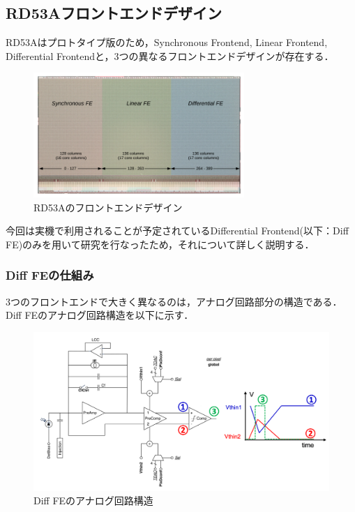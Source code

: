 \subsection{RD53Aフロントエンドデザイン}
RD53Aはプロトタイプ版のため，Synchronous Frontend, Linear Frontend, Differential Frontendと，3つの異なるフロントエンドデザインが存在する．

\begin{figure}[h]
\centering
\includegraphics[width=8cm]{./figure/RD53A_FE.png}
\caption{RD53Aのフロントエンドデザイン}
\label{fig:RD53AFE}
\end{figure}

今回は実機で利用されることが予定されているDifferential Frontend(以下：Diff FE)のみを用いて研究を行なったため，それについて詳しく説明する．

\subsubsection*{Diff FEの仕組み}
3つのフロントエンドで大きく異なるのは，アナログ回路部分の構造である．Diff FEのアナログ回路構造を以下に示す．\par

\begin{figure}[h]
\centering
\includegraphics[width=15cm]{./figure/RD53A_DiffFE.png}
\caption{Diff FEのアナログ回路構造}
\label{fig:DiffFE}
\end{figure}

